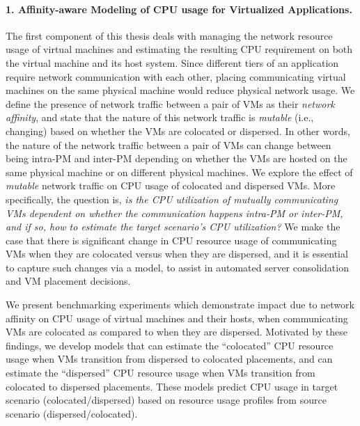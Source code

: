 \paragraph{1. Affinity-aware Modeling of CPU usage for Virtualized Applications.}
The first component of this thesis deals with managing the network 
resource usage of virtual machines and estimating the resulting CPU 
requirement on both the virtual machine 
and its host system.
Since different tiers of an application require network
communication with each other, placing communicating virtual
machines on the same physical machine 
would reduce physical network 
usage. We define the presence of network traffic between a pair
of VMs as their \textit{network affinity}, 
and state that the
nature of this network traffic is \textit{mutable} 
(i.e., changing) based on
whether the VMs are colocated or 
dispersed. In other words, the
nature of the network traffic between a pair of VMs
can change between being
intra-PM and inter-PM 
depending on whether the VMs are hosted
on the same physical machine or on different physical machines.
We explore the effect of \textit{mutable}
network traffic on CPU usage of colocated and dispersed VMs. More
specifically, the question is, \textit{is the CPU utilization of mutually
communicating VMs dependent on whether the communication happens
intra-PM or inter-PM, and if so, 
how to estimate the target scenario's CPU utilization?}
We make the case that there is significant change in CPU resource
usage of communicating VMs when they are colocated versus when they are 
dispersed, and it is
essential to capture such changes via a model, to assist in
automated server consolidation 
and VM placement decisions.

We present benchmarking experiments
which demonstrate impact due to network affinity
on CPU usage of virtual machines and their hosts, when communicating
VMs are colocated as compared to
when they are dispersed. Motivated by these findings, we develop models
that can estimate the ``colocated'' CPU resource usage when VMs transition
from dispersed to colocated placements, and can estimate the ``dispersed''
CPU resource usage when VMs transition from colocated to dispersed
placements. These models predict CPU usage in target 
scenario (colocated/dispersed) based on resource usage profiles 
from source scenario (dispersed/colocated).

